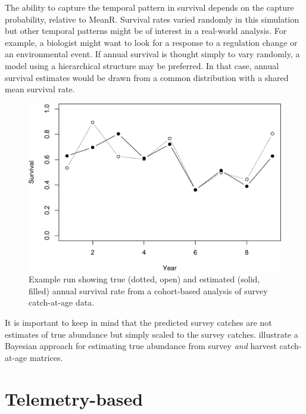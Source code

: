 \documentclass[
]{krantz}
\begin{document}
The ability to capture the temporal pattern in survival depends on the capture probability, relative to MeanR. Survival rates varied randomly in this simulation but other temporal patterns might be of interest in a real-world analysis. For example, a biologist might want to look for a response to a regulation change or an environmental event. If annual survival is thought simply to vary randomly, a model using a hierarchical structure may be preferred. In that case, annual survival estimates would be drawn from a common distribution with a shared mean survival rate.

\begin{figure}
\includegraphics[width=0.9\linewidth]{bookdown_files/figure-latex/CohortPlot-1} \caption{Example run showing true (dotted, open) and estimated (solid, filled) annual survival rate from a cohort-based analysis of survey catch-at-age data.}\label{fig:CohortPlot}
\end{figure}

It is important to keep in mind that the predicted survey catches are not estimates of true abundance but simply scaled to the survey catches. \citet{millar.meyer2000} illustrate a Bayesian approach for estimating true abundance from survey \emph{and} harvest catch-at-age matrices.

\hypertarget{TelemetryBased}{%
\section{Telemetry-based}\label{TelemetryBased}}
\end{document}
